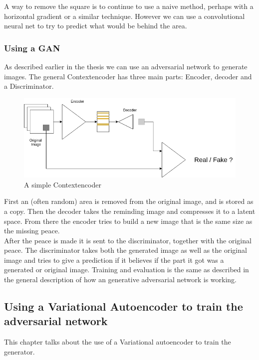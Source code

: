   A way to remove the square is to continue to use a naive method, perhaps with a horizontal gradient or a similar technique. 
  However we can use a convolutional neural net to try to predict what would be behind the area. 
  
  \subsubsection{Using a GAN}
  As described earlier in the thesis %
  we can use an adversarial network to generate images. 
  The general Contextencoder has three main parts: Encoder, decoder and a Discriminator.
  
  \begin{figure}[ht]
    \centering
    \includegraphics[scale=0.5]{methods/figures/Contextencoder.png}
    \caption{A simple Contextencoder}
  \end{figure}
  
  First an (often random) area is removed from the original image, and is stored as a copy. Then the decoder takes the reminding image and compresses it to a latent space. From there 
  the encoder tries to build a new image that is the same size as the missing peace. \\
  After the peace is made it is sent to the discriminator, together with the original peace. The discriminator takes both the generated image as well as the original image and tries to give a prediction if it
  believes if the part it got was a generated or original image.
  Training and evaluation is the same as described in the general description of how an generative adversarial network is working.
  
  \subsection{Using a Variational Autoencoder to train the adversarial network}
    This chapter talks about the use of a Variational autoencoder to train the generator.
    

